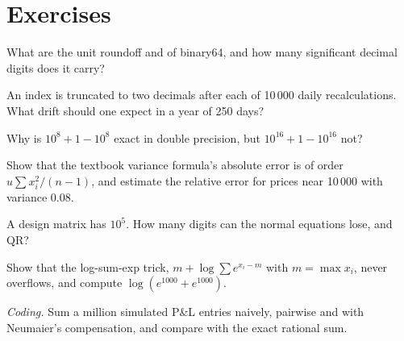 \section{Exercises}

\begin{exercise}[$\star$]\label{exo:qm:floating-point-and-numerical-linear-algebra:1}
What are the unit roundoff and  of binary64, and how many significant decimal digits does it carry?
\end{exercise}

\begin{exercise}[$\star$]\label{exo:qm:floating-point-and-numerical-linear-algebra:2}
An index is truncated to two decimals after each of 10\,000 daily recalculations. What drift should one expect in a year of 250 days?
\end{exercise}

\begin{exercise}[$\star$]\label{exo:qm:floating-point-and-numerical-linear-algebra:3}
Why is $10^8 + 1 - 10^8$ exact in double precision, but $10^{16} + 1 - 10^{16}$ not?
\end{exercise}

\begin{exercise}[$\star\star$]\label{exo:qm:floating-point-and-numerical-linear-algebra:4}
Show that the textbook variance formula's absolute error is of order $u\sum x_i^2/(n - 1)$, and estimate the relative error for prices near 10\,000 with variance 0.08.
\end{exercise}

\begin{exercise}[$\star\star$]\label{exo:qm:floating-point-and-numerical-linear-algebra:5}
A design matrix has  $10^5$. How many digits can the normal equations lose, and QR?
\end{exercise}

\begin{exercise}[$\star\star$]\label{exo:qm:floating-point-and-numerical-linear-algebra:6}
Show that the log-sum-exp trick, $m + \log\sum e^{x_i - m}$ with $m = \max x_i$, never overflows, and compute $\log(e^{1000} + e^{1000})$.
\end{exercise}

\begin{exercise}[$\star\star\star$]\label{exo:qm:floating-point-and-numerical-linear-algebra:7}
\emph{Coding.} Sum a million simulated P\&L entries naively, pairwise and with Neumaier's compensation, and compare with the exact rational sum.
\end{exercise}

